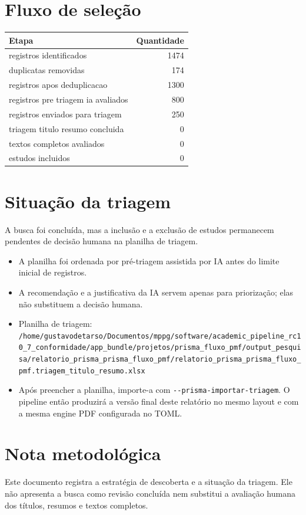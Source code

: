 \documentclass[12pt,a4paper]{article}
\begin{document}
\section{Fluxo de seleção}
\label{sec:org4c356f0}
\begin{center}
\begin{tabular}{lr}
Etapa & Quantidade\\
\hline
registros identificados & 1474\\
duplicatas removidas & 174\\
registros apos deduplicacao & 1300\\
registros pre triagem ia avaliados & 800\\
registros enviados para triagem & 250\\
triagem titulo resumo concluida & 0\\
textos completos avaliados & 0\\
estudos incluidos & 0\\
\end{tabular}
\end{center}

\section{Situação da triagem}
\label{sec:org5d9e1a5}
A busca foi concluída, mas a inclusão e a exclusão de estudos permanecem pendentes de decisão humana na planilha de triagem.
\begin{itemize}
\item A planilha foi ordenada por pré-triagem assistida por IA antes do limite inicial de registros.
\item A recomendação e a justificativa da IA servem apenas para priorização; elas não substituem a decisão humana.
\item Planilha de triagem: \texttt{/home/gustavodetarso/Documentos/mppg/software/academic\_pipeline\_rc10\_7\_conformidade/app\_bundle/projetos/prisma\_fluxo\_pmf/output\_pesquisa/relatorio\_prisma\_prisma\_fluxo\_pmf/relatorio\_prisma\_prisma\_fluxo\_pmf.triagem\_titulo\_resumo.xlsx}
\item Após preencher a planilha, importe-a com \texttt{-{}-prisma-importar-triagem}. O pipeline então produzirá a versão final deste relatório no mesmo layout e com a mesma engine PDF configurada no TOML.
\end{itemize}

\section{Nota metodológica}
\label{sec:org64cb021}
Este documento registra a estratégia de descoberta e a situação da triagem. Ele não apresenta a busca como revisão concluída nem substitui a avaliação humana dos títulos, resumos e textos completos.
\end{document}
